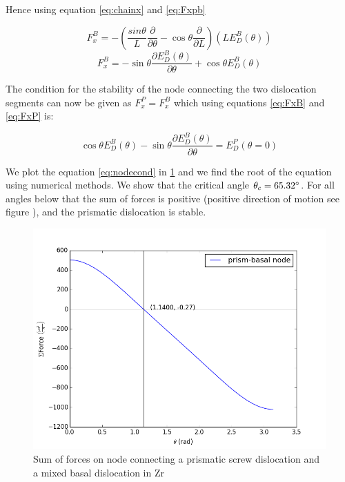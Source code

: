 \documentclass[10pt,a4paper,final]{article}
\begin{document}
Hence using equation \ref{eq:chainx} and \ref{eq:Fxpb}

\begin{equation*}
F_x^B = -\left(\frac{sin\theta}{L}\frac{\partial}{\partial\theta} - \cos\theta\frac{\partial}{\partial L}\right)\left(LE_D^B(\theta)\right)
\end{equation*}
\begin{equation}
F_x^B = -\sin\theta\frac{\partial E_D^B(\theta)}{\partial\theta} + \cos\theta E_D^B(\theta) \label{eq:FxB}
\end{equation}

The condition for the stability of the node connecting the two dislocation segments can now be given as $F_x^P = F_x^B$ which using equations \ref{eq:FxB} and \ref{eq:FxP} is:

\begin{equation}
\boxed{ \cos\theta E_D^B(\theta) - \sin\theta\frac{\partial E_D^B(\theta)}{\partial\theta} = E_D^P(\theta=0) } \label{eq:nodecond}
\end{equation}

We plot the equation \ref{eq:nodecond} in \ref{fig:nodestab} and we find the root of the equation using numerical methods. We show that the critical angle $\theta_c = 65.32\degree$. For all angles below that the sum of forces is positive (positive direction of motion see figure \label{fig:fig:crossslip}), and the prismatic dislocation is stable.

\begin{figure}
\centering
\includegraphics[scale=0.6]{png/force_node.png}
\caption{Sum of forces on node connecting a prismatic screw dislocation and a mixed basal dislocation in Zr}
\label{fig:nodestab}
\end{figure}
\pagebreak
\end{document}
